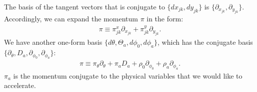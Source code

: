 \documentclass[12pt]{article}
\begin{document}
The basis of the tangent vectors
that is conjugate to $\{dx_{jk}, dy_{jk}\}$
is $\{\partial_{x_{jk}}, \partial_{y_{jk}} \}$.
Accordingly, we can expand the momentum $\pi$ in the form:
\begin{align}
  \pi
  \equiv
  \pi^x_{jk}\partial_{x_{jk}}
  +
  \pi^y_{jk}\partial_{y_{jk}}.
\end{align}
We have another one-form basis
$\{d\theta, \Theta_a, d\phi_0, d\phi_a\}$,
which has the conjugate basis
$\{\partial_\theta, D_a, \partial_{\phi_0}, \partial_{\phi_a} \}$:
\begin{align}
  \pi
  \equiv
  \pi_\theta \partial_{\theta}
  +
  \pi_a D_a
  +
  \rho_0 \partial_{\phi_0}
  +
  \rho_a \partial_{\phi_a}.
\end{align}
$\pi_a$ is the momentum conjugate to the physical variables
that we would like to accelerate.
\end{document}
